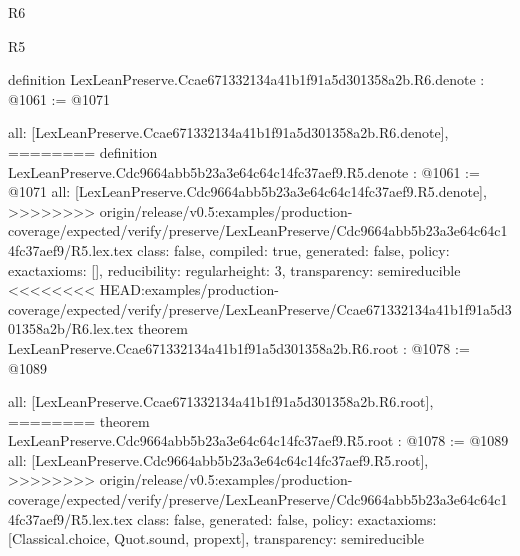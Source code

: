\begin{lexlean}{R6}
\begin{lexlean}{R5}
\begin{coremodule}
{{{{{{{definition LexLeanPreserve.Ccae671332134a41b1f91a5d301358a2b.R6.denote : @1061 := @1071 {
  all: [LexLeanPreserve.Ccae671332134a41b1f91a5d301358a2b.R6.denote],
========
definition LexLeanPreserve.Cdc9664abb5b23a3e64c64c14fc37aef9.R5.denote : @1061 := @1071 {
  all: [LexLeanPreserve.Cdc9664abb5b23a3e64c64c14fc37aef9.R5.denote],
>>>>>>>> origin/release/v0.5:examples/production-coverage/expected/verify/preserve/LexLeanPreserve/Cdc9664abb5b23a3e64c64c14fc37aef9/R5.lex.tex
  class: false,
  compiled: true,
  generated: false,
  policy: exact{axioms: []},
  reducibility: regular{height: 3},
  transparency: semireducible
}
<<<<<<<< HEAD:examples/production-coverage/expected/verify/preserve/LexLeanPreserve/Ccae671332134a41b1f91a5d301358a2b/R6.lex.tex
theorem LexLeanPreserve.Ccae671332134a41b1f91a5d301358a2b.R6.root : @1078 := @1089 {
  all: [LexLeanPreserve.Ccae671332134a41b1f91a5d301358a2b.R6.root],
========
theorem LexLeanPreserve.Cdc9664abb5b23a3e64c64c14fc37aef9.R5.root : @1078 := @1089 {
  all: [LexLeanPreserve.Cdc9664abb5b23a3e64c64c14fc37aef9.R5.root],
>>>>>>>> origin/release/v0.5:examples/production-coverage/expected/verify/preserve/LexLeanPreserve/Cdc9664abb5b23a3e64c64c14fc37aef9/R5.lex.tex
  class: false,
  generated: false,
  policy: exact{axioms: [Classical.choice, Quot.sound, propext]},
  transparency: semireducible
}

}}}}}}}}}
\end{coremodule}
\end{lexlean}
\end{lexlean}
